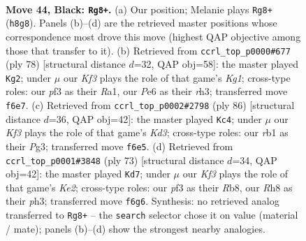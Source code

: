 \documentclass[11pt]{article}
\begin{document}
\clearpage

\begin{figure}[p]\centering
\begin{subfigure}{0.46\textwidth}\centering
\resizebox{\linewidth}{!}{%
\newchessgame
\chessboard[
  setfen={7r/1p3p2/pR2pk2/8/P3P3/5PKP/7P/1R6 b - - 18 44},
  showmover=false,
  pgfstyle=straightmove, color=movearrow, markmove={h8-g8}
]}
\caption{}
\end{subfigure}\hfill
\begin{subfigure}{0.46\textwidth}\centering
\resizebox{\linewidth}{!}{%
\newchessgame
\chessboard[
  setfen={3R4/5ppk/7p/5Pr1/2p3P1/7r/5P2/R5K1 w - - 0 40},
  showmover=false,
  pgfstyle=straightmove, color=movearrow, markmove={g1-g2}
]}
\caption{}
\end{subfigure}
\\[4pt]
\begin{subfigure}{0.46\textwidth}\centering
\resizebox{\linewidth}{!}{%
\newchessgame
\chessboard[
  setfen={8/p7/P2rk1p1/R4p1p/3P4/1p1KP1P1/1P6/8 w - - 0 44},
  showmover=false,
  pgfstyle=straightmove, color=movearrow, markmove={d3-c4}
]}
\caption{}
\end{subfigure}\hfill
\begin{subfigure}{0.46\textwidth}\centering
\resizebox{\linewidth}{!}{%
\newchessgame
\chessboard[
  setfen={1r6/r3kp2/2p1p3/P5p1/1PRP3p/4R2P/5P2/5K2 b - - 0 37},
  showmover=false,
  pgfstyle=straightmove, color=movearrow, markmove={e7-d7}
]}
\caption{}
\end{subfigure}
\caption{\textbf{Move 44, Black: \texttt{Rg8+}.} (a) Our position; Melanie plays \texttt{Rg8+} (\texttt{h8g8}). Panels (b)--(d) are the retrieved master positions whose correspondence most drove this move (highest QAP objective among those that transfer to it). (b) Retrieved from \texttt{ccrl\_top\_p0000\#677} (ply 78) [structural distance $d$=32, QAP obj=58]: the master played \texttt{Kg2}; under $\mu$ our \emph{Kf3} plays the role of that game's \emph{Kg1}; cross-type roles: our \emph{p}f3 as their \emph{R}a1, our \emph{P}e6 as their \emph{r}h3; transferred move \texttt{f6e7}. (c) Retrieved from \texttt{ccrl\_top\_p0002\#2798} (ply 86) [structural distance $d$=36, QAP obj=42]: the master played \texttt{Kc4}; under $\mu$ our \emph{Kf3} plays the role of that game's \emph{Kd3}; cross-type roles: our \emph{r}b1 as their \emph{P}g3; transferred move \texttt{f6e5}. (d) Retrieved from \texttt{ccrl\_top\_p0001\#3848} (ply 73) [structural distance $d$=34, QAP obj=42]: the master played \texttt{Kd7}; under $\mu$ our \emph{Kf3} plays the role of that game's \emph{Ke2}; cross-type roles: our \emph{p}f3 as their \emph{R}b8, our \emph{R}h8 as their \emph{p}h3; transferred move \texttt{f6g6}. Synthesis: no retrieved analog transferred to \texttt{Rg8+} -- the \texttt{search} selector chose it on value (material / mate); panels (b)--(d) show the strongest nearby analogies.}
\label{fig:thought-m87}
\end{figure}
\end{document}
